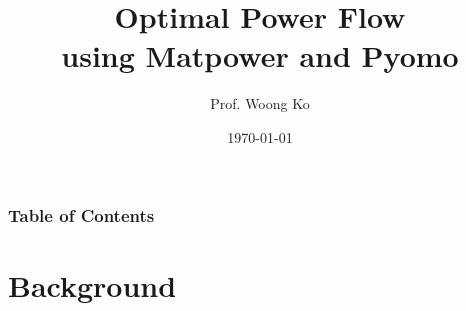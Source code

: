 \documentclass[
	11pt, %
	aspectratio=169, %
]{beamer}
\title[OPF using Matpower and Pyomo]{Optimal Power Flow \\ using Matpower and Pyomo} %
\author[Woong Ko]{Prof. Woong Ko} %
\institute[CWNU]{Changwon National University \\ \smallskip \textit{kwoong@changwon.ac.kr}} %
\date[\today]{\today} %
\begin{document}

\begin{frame}
	\titlepage %
\end{frame}



\begin{frame}
	\frametitle{Table of Contents} %
	
	\tableofcontents %
\end{frame}


\section{Background} %
\end{document}
